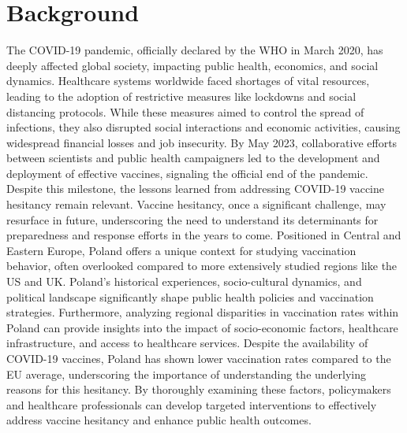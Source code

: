\documentclass[a4paper,12pt]{article} %
\begin{document}
\section{Background}	
The COVID-19 pandemic, officially declared by the WHO in March 2020, has deeply affected global society, impacting public health, economics, and social dynamics. Healthcare systems worldwide faced shortages of vital resources, leading to the adoption of restrictive measures like lockdowns and social distancing protocols. While these measures aimed to control the spread of infections, they also disrupted social interactions and economic activities, causing widespread financial losses and job insecurity.
By May 2023, collaborative efforts between scientists and public health campaigners led to the development and deployment of effective vaccines, signaling the official end of the pandemic. Despite this milestone, the lessons learned from addressing COVID-19 vaccine hesitancy remain relevant. Vaccine hesitancy, once a significant challenge, may resurface in future, underscoring the need to understand its determinants for preparedness and response efforts in the years to come.
Positioned in Central and Eastern Europe, Poland offers a unique context for studying vaccination behavior, often overlooked compared to more extensively studied regions like the US and UK. Poland's historical experiences, socio-cultural dynamics, and political landscape significantly shape public health policies and vaccination strategies. Furthermore, analyzing regional disparities in vaccination rates within Poland can provide insights into the impact of socio-economic factors, healthcare infrastructure, and access to healthcare services. Despite the availability of COVID-19 vaccines, Poland has shown lower vaccination rates compared to the EU average, underscoring the importance of understanding the underlying reasons for this hesitancy. \cite{covid_vaccine_tracker}
By thoroughly examining these factors, policymakers and healthcare professionals can develop targeted interventions to effectively address vaccine hesitancy and enhance public health outcomes.
\end{document}
